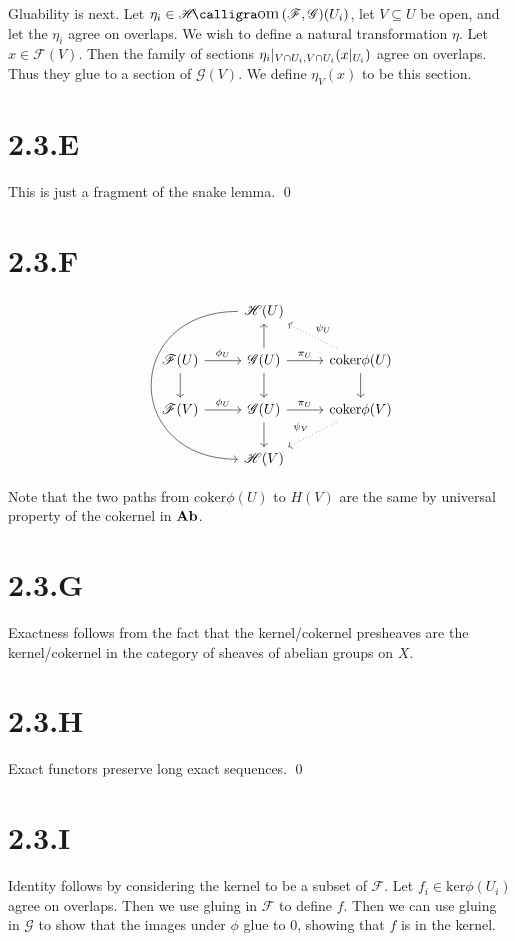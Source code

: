 \documentclass{article}
\begin{document}
Gluability is next. Let $\eta_i \in \Hom(\mathscr{F},\mathscr{G})(U_i)$,
let $V \subseteq U$ be open, and let the $\eta_i$ agree on overlaps.
We wish to define a natural transformation $\eta$. Let $x \in \mathscr{F}(V)$.
Then the family of sections $\eta_i|_{V \cap U_i, V \cap U_i}(x|_{U_i})$ agree on overlaps.
Thus they glue to a section of $\mathscr{G}(V)$. We define $\eta_V(x)$ to be this section.

\section*{2.3.E}
This is just a fragment of the snake lemma. \qed

\section*{2.3.F}

\[
    \begin{tikzcd}
         & \mathscr{H}(U) \ar[to=V, bend right=90, looseness=2]        \\
        \mathscr{F}(U) \ar[d] \ar[r, "\phi_U"]
         & \mathscr{G}(U) \ar[d] \ar[u] \ar[r, "\pi_U"]
         & \text{coker} \phi(U) \ar[d] \ar[ul, dotted, "\psi_U", swap] \\
        \mathscr{F}(V) \ar[r, "\phi_U"]
         & \mathscr{G}(U) \ar[d] \ar[r, "\pi_U"]
         & \text{coker} \phi(V) \ar[dl, dotted, "\psi_V", swap]        \\
         & |[alias=V]| \mathscr{H}(V)
    \end{tikzcd}
\]

Note that the two paths from $\text{coker}\phi(U)$ to $H(V)$
are the same by universal property of the cokernel in $\mathbf{Ab}$.

\section*{2.3.G}
Exactness follows from the fact that the kernel/cokernel presheaves are the kernel/cokernel
in the category of sheaves of abelian groups on $X$.

\section*{2.3.H}
Exact functors preserve long exact sequences. \qed

\section*{2.3.I}
Identity follows by considering the kernel to be a subset of $\mathscr{F}$.
Let $f_i \in \text{ker}\phi(U_i)$ agree on overlaps. Then we use gluing in $\mathscr{F}$ to
define $f$. Then we can use gluing in $\mathscr{G}$
to show that the images under $\phi$ glue to 0, showing that $f$ is in the kernel.
\end{document}
